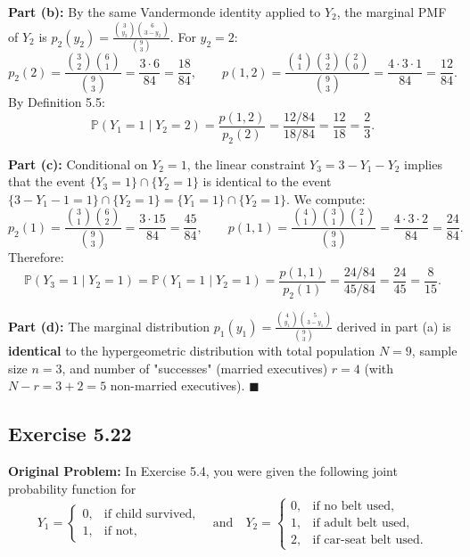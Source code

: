 \documentclass[11pt, letterpaper]{article}
\theoremstyle{definition}
\theoremstyle{remark}
\newcommand{\Prob}{\mathbb{P}}
\begin{document}
\textbf{Part (b):} By the same Vandermonde identity applied to $Y_2$, the marginal PMF of $Y_2$ is $p_2(y_2) = \frac{\binom{3}{y_2}\binom{6}{3-y_2}}{\binom{9}{3}}$. For $y_2 = 2$:
\[ p_2(2) = \frac{\binom{3}{2}\binom{6}{1}}{\binom{9}{3}} = \frac{3 \cdot 6}{84} = \frac{18}{84}, \qquad p(1, 2) = \frac{\binom{4}{1}\binom{3}{2}\binom{2}{0}}{\binom{9}{3}} = \frac{4 \cdot 3 \cdot 1}{84} = \frac{12}{84}. \]
By Definition 5.5:
\[ \Prob(Y_1 = 1 \mid Y_2 = 2) = \frac{p(1, 2)}{p_2(2)} = \frac{12/84}{18/84} = \frac{12}{18} = \frac{2}{3}. \]

\textbf{Part (c):} Conditional on $Y_2 = 1$, the linear constraint $Y_3 = 3 - Y_1 - Y_2$ implies that the event $\{Y_3 = 1\} \cap \{Y_2 = 1\}$ is identical to the event $\{3 - Y_1 - 1 = 1\} \cap \{Y_2 = 1\} = \{Y_1 = 1\} \cap \{Y_2 = 1\}$. We compute:
\[ p_2(1) = \frac{\binom{3}{1}\binom{6}{2}}{\binom{9}{3}} = \frac{3 \cdot 15}{84} = \frac{45}{84}, \qquad p(1, 1) = \frac{\binom{4}{1}\binom{3}{1}\binom{2}{1}}{\binom{9}{3}} = \frac{4 \cdot 3 \cdot 2}{84} = \frac{24}{84}. \]
Therefore:
\[ \Prob(Y_3 = 1 \mid Y_2 = 1) = \Prob(Y_1 = 1 \mid Y_2 = 1) = \frac{p(1, 1)}{p_2(1)} = \frac{24/84}{45/84} = \frac{24}{45} = \frac{8}{15}. \]

\textbf{Part (d):} The marginal distribution $p_1(y_1) = \frac{\binom{4}{y_1}\binom{5}{3-y_1}}{\binom{9}{3}}$ derived in part (a) is \textbf{identical} to the hypergeometric distribution with total population $N = 9$, sample size $n = 3$, and number of "successes" (married executives) $r = 4$ (with $N - r = 3 + 2 = 5$ non-married executives). $\blacksquare$

\subsection{Exercise 5.22}

\textbf{Original Problem:}
In Exercise 5.4, you were given the following joint probability function for
\[ Y_1 = \begin{cases} 0, & \text{if child survived,} \\ 1, & \text{if not,} \end{cases} \quad \text{and} \quad Y_2 = \begin{cases} 0, & \text{if no belt used,} \\ 1, & \text{if adult belt used,} \\ 2, & \text{if car-seat belt used.} \end{cases} \]
\end{document}

